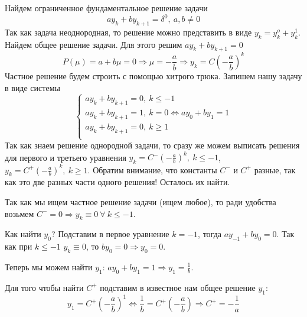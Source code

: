 \begin{example}
  Найдем ограниченное фундаментальное решение задачи
  \[ay_k+by_{k+1}=\delta^0,\ a,b\neq0\]
  Так как задача неоднородная, то решение можно представить в виде
  $y_k=y_k^o+y_k^1$.
  Найдем общее решение задачи. Для этого решим $ay_k+by_{k+1}=0$
  \[P(\mu)=a+b\mu=0\Rightarrow\mu=-\frac{a}{b}\Rightarrow y_k=C\left(-\frac{a}{b}\right)^k\]
  Частное решение будем строить с помощью хитрого трюка. Запишем
  нашу задачу в виде системы
  \[\begin{cases}
      ay_k+by_{k+1}=0,\ k\leq -1                           \\
      ay_k+by_{k+1}=1,\ k =  0 \Leftrightarrow ay_0+by_1=1 \\
      ay_k+by_{k+1}=0,\ k \geq 1                           \\
    \end{cases}\]
  Так как знаем решение однородной задачи, то сразу
  же можем выписать решения для первого и третьего уравнения
  $y_k=C^-\left(-\frac{a}{b}\right)^k,\ k\leq -1$,
  $y_k=C^+\left(-\frac{a}{b}\right)^k,\ k\geq 1$.
  Обратим внимание, что константы $C^-$ и $C^+$ разные,
  так как это две разных части одного решения! Осталось их найти.

  Так как мы ищем частное решение задачи (ищем любое),
  то ради удобства возьмем $C^-=0\Rightarrow y_k\equiv 0\ \forall\ k\leq-1$.

  Как найти $y_0$? Подставим в первое уравнение $k=-1$, тогда
  $ay_{-1}+by_0=0$. Так как при $k\leq-1$ $y_k\equiv0$, то
  $by_0=0\Rightarrow y_0=0$.

  Теперь мы можем найти $y_1$: $ay_0+by_1=1\Rightarrow y_1=\frac{1}{b}$.

  Для того чтобы найти $C^+$ подставим
  в известное нам общее решение $y_1$:
  \[y_1=C^+\left(-\frac{a}{b}\right)^1\Leftrightarrow\frac{1}{b}=C^+\left(-\frac{a}{b}\right)\Rightarrow C^+=-\frac{1}{a}\]


\end{example}
